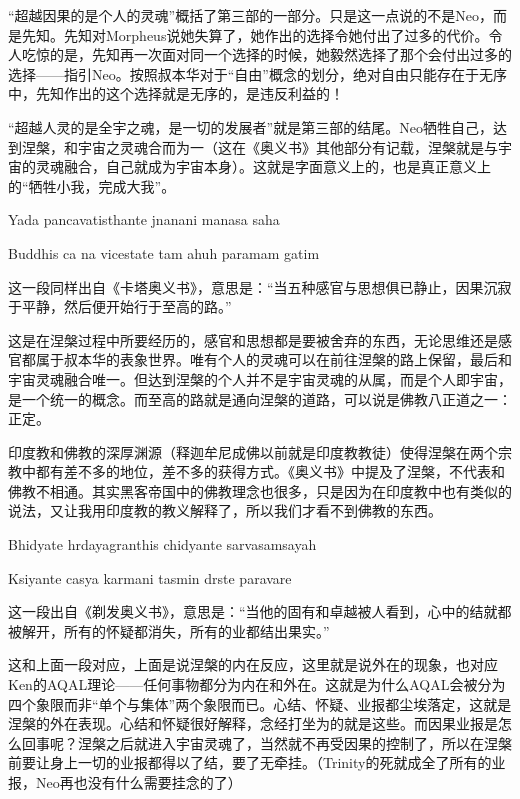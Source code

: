 \documentclass[UTF8]{ctexart}
\newenvironment{myquote}{\color{green} \setlength{\leftskip}{6em} \setlength{\rightskip}{4em} \setlength{\parindent}{-2em}}{\par}
\begin{document}
“超越因果的是个人的灵魂”概括了第三部的一部分。只是这一点说的不是Neo，而是先知。先知对Morpheus说她失算了，她作出的选择令她付出了过多的代价。令人吃惊的是，先知再一次面对同一个选择的时候，她毅然选择了那个会付出过多的选择——指引Neo。按照叔本华对于“自由”概念的划分，绝对自由只能存在于无序中，先知作出的这个选择就是无序的，是违反利益的！

“超越人灵的是全宇之魂，是一切的发展者”就是第三部的结尾。Neo牺牲自己，达到涅槃，和宇宙之灵魂合而为一（这在《奥义书》其他部分有记载，涅槃就是与宇宙的灵魂融合，自己就成为宇宙本身）。这就是字面意义上的，也是真正意义上的“牺牲小我，完成大我”。

\begin{myquote}
Yada pancavatisthante jnanani manasa saha

Buddhis ca na vicestate tam ahuh paramam gatim
\end{myquote}

这一段同样出自《卡塔奥义书》，意思是：“当五种感官与思想俱已静止，因果沉寂于平静，然后便开始行于至高的路。”

这是在涅槃过程中所要经历的，感官和思想都是要被舍弃的东西，无论思维还是感官都属于叔本华的表象世界。唯有个人的灵魂可以在前往涅槃的路上保留，最后和宇宙灵魂融合唯一。但达到涅槃的个人并不是宇宙灵魂的从属，而是个人即宇宙，是一个统一的概念。而至高的路就是通向涅槃的道路，可以说是佛教八正道之一：正定。

印度教和佛教的深厚渊源（释迦牟尼成佛以前就是印度教教徒）使得涅槃在两个宗教中都有差不多的地位，差不多的获得方式。《奥义书》中提及了涅槃，不代表和佛教不相通。其实黑客帝国中的佛教理念也很多，只是因为在印度教中也有类似的说法，又让我用印度教的教义解释了，所以我们才看不到佛教的东西。

\begin{myquote}
Bhidyate hrdayagranthis chidyante sarvasamsayah

Ksiyante casya karmani tasmin drste paravare
\end{myquote}

这一段出自《剃发奥义书》，意思是：“当他的固有和卓越被人看到，心中的结就都被解开，所有的怀疑都消失，所有的业都结出果实。”

这和上面一段对应，上面是说涅槃的内在反应，这里就是说外在的现象，也对应Ken的AQAL理论——任何事物都分为内在和外在。这就是为什么AQAL会被分为四个象限而非“单个与集体”两个象限而已。心结、怀疑、业报都尘埃落定，这就是涅槃的外在表现。心结和怀疑很好解释，念经打坐为的就是这些。而因果业报是怎么回事呢？涅槃之后就进入宇宙灵魂了，当然就不再受因果的控制了，所以在涅槃前要让身上一切的业报都得以了结，要了无牵挂。（Trinity的死就成全了所有的业报，Neo再也没有什么需要挂念的了）
\end{document}
